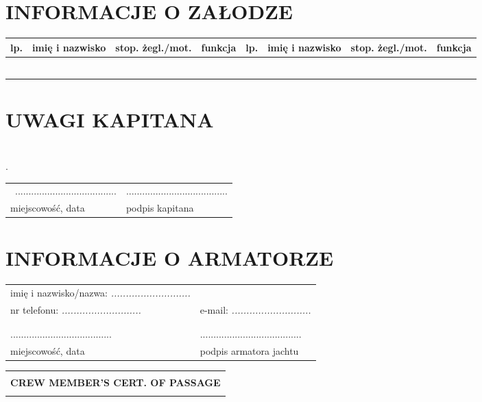 \documentclass{article}
\begin{document}
\section*{INFORMACJE O ZAŁODZE}
    \begin{tabular}{|m{}|m{}|m{}|m{}||m{}|m{}|m{}|m{}|}
    \hline
    lp. & imię i nazwisko & stop. żegl./mot. & funkcja & lp. & imię i nazwisko &stop. żegl./mot. & funkcja\\
    \hline
    
&&&&&&&\\
\hline
&&&&&&&\\
\hline
&&&&&&&\\
\hline
&&&&&&&\\
\hline
&&&&&&&\\
\hline
&&&&&&&\\
\hline

    \end{tabular}
    
    
\section*{UWAGI KAPITANA}


\textit{}\dotfill \\
.\dotfill \\
\begin{tabularx}{\textwidth}{X X}
\\\
...................................... & ......................................\\
miejscowość, data & podpis kapitana\\
\end{tabularx}
\section*{INFORMACJE O ARMATORZE}

\begin{tabularx}{\textwidth}{X X}
imię i nazwisko/nazwa: \textit{...........................} \\
nr telefonu: \textit{...........................} & e-mail: \textit{...........................}\\
\\\\
...................................... & ......................................\\
miejscowość, data & podpis armatora jachtu\\
\end{tabularx}
\newpage
\begin{tabularx}{\textwidth} { 
  | >{\centering\arraybackslash}X | }
 \hline
 \\
 \textbf{\huge CREW MEMBER'S CERT. OF PASSAGE} \\
 \\
\hline
\end{tabularx}
\end{document}
